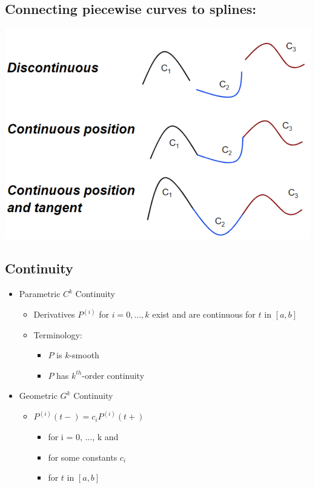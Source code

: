 \documentclass{article}
\begin{document}
\subsection*{Connecting piecewise curves to splines:}
\begin{center}
    \includegraphics*[scale=0.9]{W3_9.png}
\end{center}
\subsection*{Continuity}
\begin{itemize}
    \item Parametric $C^k$ Continuity
    \begin{itemize}
        \item Derivatives $P^{(i)}$ for $i = 0, \dots, k$ exist and are continuous for $t$ in $[a, b]$
        \item Terminology:
            \begin{itemize}
                \item $P$ is $k$-smooth
                \item $P$ has $k^{th}$-order continuity
            \end{itemize}
    \end{itemize}
    \item Geometric $G^k$ Continuity
    \begin{itemize}
        \item $P^{(i)}(t-) = c_i P^{(i)} (t+)$
            \begin{itemize}
                \item for i = 0, $\dots$, k and
                \item for some constants $c_i$
                \item for $t$ in $[a, b]$
            \end{itemize}
    \end{itemize}
\end{itemize}
\end{document}
